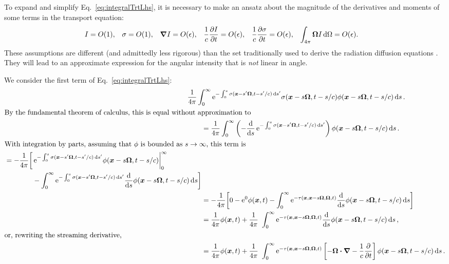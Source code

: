 \documentclass[11pt,letter,twoside]{mc2011}
\newcommand{\epsiloncolor}[1]{#1}
\begin{document}
To expand and simplify Eq.~\eqref{eq:integralTrtLhs}, it is necessary to make
an ansatz about
the magnitude of the derivatives and moments of some terms in the transport
equation:
\begin{align*}
  I &= O(\epsiloncolor{1}), &
  \sigma &= O(\epsiloncolor{1}), &
  \del I &= O(\epsiloncolor{\epsilon}), &
  \frac1c\pder{I}{t} &= O(\epsiloncolor{\epsilon}), &
  \frac1c\pder{\sigma}{t} &= O(\epsiloncolor{\epsilon}), &
  \int_{4\pi} \vec{\Omega} I\ud \Omega &= O(\epsiloncolor{\epsilon}).
\end{align*}
These assumptions are different (and admittedly less rigorous) than the set traditionally
used to derive the radiation diffusion equations \cite{Lar1983a}. They will
lead to an approximate expression for the angular intensity that is
\emph{not} linear in angle.

We consider the first term of Eq.~\eqref{eq:integralTrtLhs}: 
\begin{align*}
\lefteqn{\frac{1}{4\pi}\int_{0}^{\infty} \eexp^{ -\int_{0}^{s}
  \sigma(\vec{x}-s'\vec{\Omega}, t-s'/c) \ud s'} \sigma(\vec{x} - s \vec{\Omega}, t-s/c)
\phi(\vec{x} - s \vec{\Omega}, t-s/c) \ud s \,.}\qquad&
\\ 
\intertext{By the fundamental theorem of calculus, this is equal without
approximation to}
&=\frac{1}{4\pi}\int_{0}^{\infty} \left( - \oder{}{s} \eexp^{ -\int_{0}^{s}
  \sigma(\vec{x}-s'\vec{\Omega}, t-s'/c) \ud s'}\right)
\phi(\vec{x} - s \vec{\Omega}, t-s/c) \ud s\,.
\\
\intertext{With integration by parts, assuming that $\phi$ is bounded as
$s\to\infty$, this term is}
    \begin{split}
  &=-\frac{1}{4\pi} \bigg[ 
\eexp^{- \int_{0}^{s} \sigma(\vec{x}-s'\vec{\Omega}, t-s'/c) \ud s'} 
\phi(\vec{x} - s \vec{\Omega}, t-s/c) \bigg|_{0}^{\infty}
\\
&\qquad\qquad- \int_{0}^{\infty} \eexp^{- \int_{0}^{s} \sigma(\vec{x}-s'\vec{\Omega}, t-s'/c) \ud s'}
\oder{}{s} \phi(\vec{x} - s \vec{\Omega}, t-s/c)
\ud s
  \bigg]
    \end{split}
  \\
  &=-\frac{1}{4\pi} \bigg[ 
0 -  
\eexp^0 \phi(\vec{x}, t)
- \int_{0}^{\infty} \eexp^{-\tau(\vec{x}, \vec{x} - s \vec{\Omega}, \vec{\Omega}, t)}
\oder{}{s} \phi(\vec{x} - s \vec{\Omega}, t-s/c)
\ud s
  \bigg]
  \\
 &=\frac{1}{4\pi}\phi(\vec{x}, t)
+ \frac{1}{4\pi}\ \int_{0}^{\infty} \eexp^{-\tau(\vec{x}, \vec{x} - s \vec{\Omega}, \vec{\Omega}, t)}
\oder{}{s} \phi(\vec{x} - s \vec{\Omega}, t-s/c)
\ud s\,,
 \\
 \intertext{or, rewriting the streaming derivative,}
 &=\frac{1}{4\pi}\phi(\vec{x}, t)
+ \frac{1}{4\pi}\ \int_{0}^{\infty} \eexp^{-\tau(\vec{x}, \vec{x} - s
\vec{\Omega}, \vec{\Omega}, t)}
\left[ -\vec{\Omega} \vd \del - \frac1c \pder{}{t} \right] \phi(\vec{x} - s \vec{\Omega}, t-s/c)
\ud s\,.
\end{align*}
\end{document}
